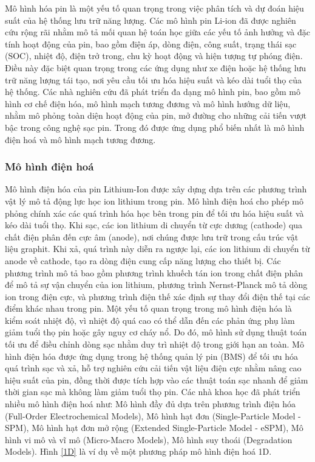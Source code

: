 \documentclass{thesis}
\begin{document}
Mô hình hóa pin là một yếu tố quan trọng trong việc phân tích và dự đoán hiệu suất của hệ thống lưu trữ năng lượng. Các mô hình pin Li-ion đã được nghiên cứu rộng rãi nhằm mô tả mối quan hệ toán học giữa các yếu tố ảnh hưởng và đặc tính hoạt động của pin, bao gồm điện áp, dòng điện, công suất, trạng thái sạc (SOC), nhiệt độ, điện trở trong, chu kỳ hoạt động và hiện tượng tự phóng điện. Điều này đặc biệt quan trọng trong các ứng dụng như xe điện hoặc hệ thống lưu trữ năng lượng tái tạo, nơi yêu cầu tối ưu hóa hiệu suất và kéo dài tuổi thọ của hệ thống. Các nhà nghiên cứu đã
 phát triển đa dạng mô hình pin, bao gồm mô hình cơ chế điện hóa, mô hình mạch
 tương đương và mô hình hướng dữ liệu, nhằm mô phỏng toàn diện hoạt động của pin,
 mở đường cho những cải tiến vượt bậc trong công nghệ sạc pin. Trong đó được ứng dụng phổ biến nhất là mô hình điện hoá và mô hình mạch tương đương.\cite{millner2010modeling}
\subsubsection{Mô hình điện hoá}
Mô hình điện hóa của pin Lithium-Ion được xây dựng dựa trên các phương trình vật lý mô tả động lực học ion lithium trong pin. Mô hình điện hoá cho phép mô phỏng chính xác các quá trình hóa học bên trong pin để tối ưu hóa hiệu suất và kéo dài tuổi thọ. Khi sạc, các ion lithium di chuyển từ cực dương (cathode) qua chất điện phân đến cực âm (anode), nơi chúng được lưu trữ trong cấu trúc vật liệu graphit. Khi xả, quá trình này diễn ra ngược lại, các ion lithium di chuyển từ anode về cathode, tạo ra dòng điện cung cấp năng lượng cho thiết bị. Các phương trình mô tả bao gồm phương trình khuếch tán ion trong chất điện phân để mô tả sự vận chuyển của ion lithium, phương trình Nernst-Planck mô tả dòng ion trong điện cực, và phương trình điện thế xác định sự thay đổi điện thế tại các điểm khác nhau trong pin. Một yếu tố quan trọng trong mô hình điện hóa là kiểm soát nhiệt độ, vì nhiệt độ quá cao có thể dẫn đến các phản ứng phụ làm giảm tuổi thọ pin hoặc gây nguy cơ cháy nổ. Do đó, mô hình sử dụng thuật toán tối ưu để điều chỉnh dòng sạc nhằm duy trì nhiệt độ trong giới hạn an toàn. Mô hình điện hóa được ứng dụng trong hệ thống quản lý pin (BMS) để tối ưu hóa quá trình sạc và xả, hỗ trợ nghiên cứu cải tiến vật liệu điện cực nhằm nâng cao hiệu suất của pin, đồng thời được tích hợp vào các thuật toán sạc nhanh để giảm thời gian sạc mà không làm giảm tuổi thọ pin. Các nhà khoa học đã phát triển nhiều mô hình điện hoá như: Mô hình đầy đủ dựa trên phương trình điện hóa (Full-Order Electrochemical Models), Mô hình hạt đơn (Single-Particle Model - SPM), Mô hình hạt đơn mở rộng (Extended Single-Particle Model - eSPM), Mô hình vi mô và vĩ mô (Micro-Macro Models), Mô hình suy thoái (Degradation Models). Hình \ref{1D} là ví dụ về một phương pháp mô hình điện hoá 1D. \cite{pramanik2016electrochemical}\cite{rahman2016electrochemical}
\end{document}
